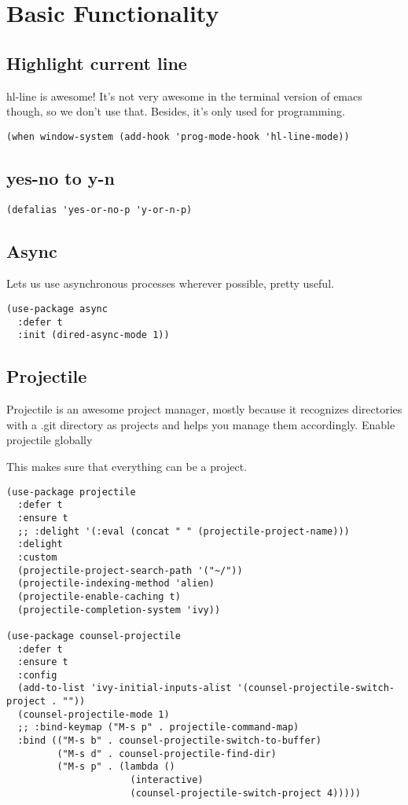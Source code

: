 \documentclass[12pt]{article}
\begin{document}
\section{Basic Functionality}
\label{sec:org99bf088}
\subsection{Highlight current line}
\label{sec:org5b0aa0b}

hl-line is awesome! It’s not very awesome in the terminal version of emacs though, so we don’t use that. Besides, it’s only used for programming.
\begin{verbatim}
(when window-system (add-hook 'prog-mode-hook 'hl-line-mode))
\end{verbatim}

\subsection{yes-no to y-n}
\label{sec:org9dc1237}
\begin{verbatim}
(defalias 'yes-or-no-p 'y-or-n-p)
\end{verbatim}

\subsection{Async}
\label{sec:orgbf7a072}

Lets us use asynchronous processes wherever possible, pretty useful.
\begin{verbatim}
(use-package async
  :defer t
  :init (dired-async-mode 1))
\end{verbatim}

\subsection{Projectile}
\label{sec:org8234084}
Projectile is an awesome project manager, mostly because it recognizes directories with a .git directory as projects and helps you manage them accordingly.
Enable projectile globally

This makes sure that everything can be a project.
\begin{verbatim}
(use-package projectile
  :defer t
  :ensure t
  ;; :delight '(:eval (concat " " (projectile-project-name)))
  :delight
  :custom
  (projectile-project-search-path '("~/"))
  (projectile-indexing-method 'alien)
  (projectile-enable-caching t)
  (projectile-completion-system 'ivy))

(use-package counsel-projectile
  :defer t
  :ensure t
  :config
  (add-to-list 'ivy-initial-inputs-alist '(counsel-projectile-switch-project . ""))
  (counsel-projectile-mode 1)
  ;; :bind-keymap ("M-s p" . projectile-command-map)
  :bind (("M-s b" . counsel-projectile-switch-to-buffer)
         ("M-s d" . counsel-projectile-find-dir)
         ("M-s p" . (lambda ()
                      (interactive)
                      (counsel-projectile-switch-project 4)))))
\end{verbatim}
\end{document}
